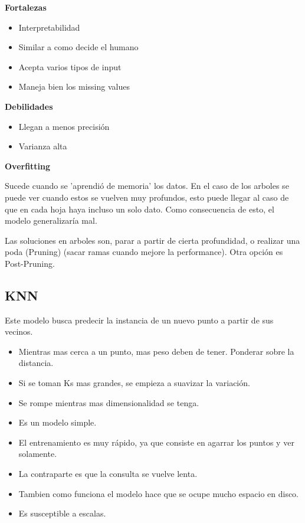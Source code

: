 \documentclass[titlepage,a4paper]{article}
\begin{document}

\textbf{Fortalezas}

\begin{itemize}
    \item Interpretabilidad
    \item Similar a como decide el humano
    \item Acepta varios tipos de input
    \item Maneja bien  los missing values
\end{itemize}

\textbf{Debilidades}

\begin{itemize}
    \item Llegan a menos precisión
    \item Varianza alta
\end{itemize}

\textbf{Overfitting}

Sucede cuando se 'aprendió de memoria' los datos. En el caso de los arboles se puede ver cuando estos se vuelven muy profundos, esto puede llegar al caso de que en cada hoja haya incluso un solo dato. Como consecuencia de esto, el modelo generalizaría mal.

Las soluciones en arboles son, parar a partir de cierta profundidad, o realizar una poda (Pruning)  (sacar ramas cuando mejore la performance). Otra opción es Post-Pruning.

\subsection{KNN}
Este modelo busca predecir la instancia de un nuevo punto a partir de sus vecinos.

\begin{itemize}
    \item Mientras mas cerca a un punto, mas peso deben de tener. Ponderar sobre la distancia.
    \item Si se toman Ks mas grandes, se empieza a suavizar la variación.
    \item Se rompe mientras mas dimensionalidad se tenga.
    \item Es un modelo simple.
    \item El entrenamiento es muy rápido, ya que consiste en agarrar los puntos y ver solamente.
    \item La contraparte es que la consulta se vuelve lenta.
    \item Tambien como funciona el modelo hace que se ocupe mucho espacio en disco.
    \item Es susceptible a escalas.
\end{itemize}
\end{document}
